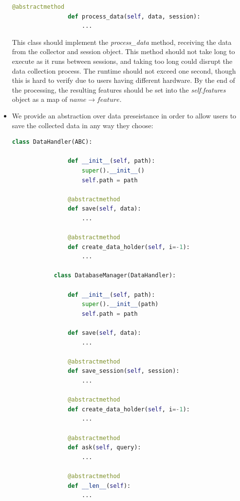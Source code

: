 \documentclass[../main.tex]{subfiles}
\begin{document}
\begin{itemize}
\begin{lstlisting}[language=Python]
                @abstractmethod
                def process_data(self, data, session):
                    ...
        \end{lstlisting}
        This class should implement the \textit{process\_data} method, receiving the data from the collector and session object. 
        This method should not take long to execute as it runs between sessions, and taking too long could disrupt the data collection process. 
        The runtime should not exceed one second, though this is hard to verify due to users having different hardware. 
        By the end of the processing, the resulting features should be set into the \textit{self.features} object as a map of $name \rightarrow feature$.
    \item We provide an abstraction over data preseistance in order to allow users to save the collected data in any way they choose:
        \begin{lstlisting}[language=Python]
            class DataHandler(ABC):

                def __init__(self, path):
                    super().__init__()
                    self.path = path

                @abstractmethod
                def save(self, data):
                    ...

                @abstractmethod
                def create_data_holder(self, i=-1):
                    ...

            class DatabaseManager(DataHandler):

                def __init__(self, path):
                    super().__init__(path)
                    self.path = path
            
                def save(self, data):
                    ...
            
                @abstractmethod
                def save_session(self, session):
                    ...
            
                @abstractmethod
                def create_data_holder(self, i=-1):
                    ...
            
                @abstractmethod
                def ask(self, query):
                    ...
            
                @abstractmethod
                def __len__(self):
                    ...
            

\end{lstlisting}
\end{itemize}
\end{document}
